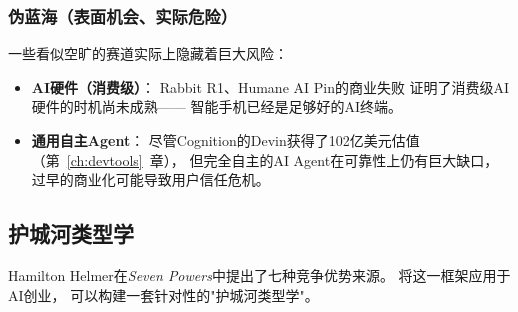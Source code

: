 \subsubsection{伪蓝海（表面机会、实际危险）}
一些看似空旷的赛道实际上隐藏着巨大风险：
\begin{itemize}
  \item \textbf{AI硬件（消费级）}：
    Rabbit R1、Humane AI Pin的商业失败
    证明了消费级AI硬件的时机尚未成熟——
    智能手机已经是足够好的AI终端。
  \item \textbf{通用自主Agent}：
    尽管Cognition的Devin获得了102亿美元估值
    （第~\ref{ch:devtools}~章），
    但完全自主的AI Agent在可靠性上仍有巨大缺口，
    过早的商业化可能导致用户信任危机。
\end{itemize}


\subsection{护城河类型学}

Hamilton Helmer在\textit{Seven Powers}中提出了七种竞争优势来源。
将这一框架应用于AI创业，
可以构建一套针对性的"护城河类型学"。

